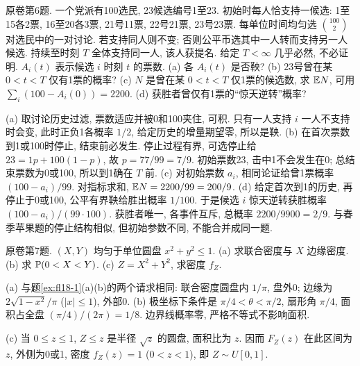 \begin{exercise}\label{ex:flf19-6}
原卷第6题. 一个党派有100选民, 23候选编号1至23. 初始时每人恰支持一候选: 1至15各2票, 16至20各3票, 21号11票, 22号21票, 23号23票. 每单位时间均匀选 $\binom{100}2$ 对选民中的一对讨论. 若支持同人则不变; 否则公平币选其中一人转而支持另一人候选. 持续至时刻 $T$ 全体支持同一人, 该人获提名. 给定 $T<\infty$ 几乎必然, 不必证明. $A_i(t)$ 表示候选 $i$ 时刻 $t$ 的票数. (a) 各 $A_i(t)$ 是否鞅? (b) 23号曾在某 $0<t<T$ 仅有1票的概率? (c) $N$ 是曾在某 $0<t<T$ 仅1票的候选数, 求 $\mathbb E N$, 可用 $\sum_i(100-A_i(0))=2200$. (d) 获胜者曾仅有1票的``惊天逆转''概率?
\end{exercise}
\begin{solution}
(a)\label{sol:flf19-6-a} 取讨论历史过滤, 票数适应并被0和100夹住, 可积. 只有一人支持 $i$ 一人不支持时会变, 此时正负1各概率 $1/2$, 给定历史的增量期望零, 所以是鞅.
(b)\label{sol:flf19-6-b} 在首次票数到1或100时停止, 结束前必发生. 停止过程有界, 可选停止给 $23=1p+100(1-p)$, 故 $p=77/99=7/9$. 初始票数23, 击中1不会发生在0; 总结束票数为0或100, 所以到1确在 $T$ 前.
(c)\label{sol:flf19-6-c} 对初始票数 $a_i$, 相同论证给曾1票概率 $(100-a_i)/99$. 对指标求和, $\mathbb E N=2200/99=200/9$.
(d)\label{sol:flf19-6-d} 给定首次到1的历史, 再停止于0或100, 公平有界鞅给胜出概率 $1/100$. 于是候选 $i$ 惊天逆转获胜概率 $(100-a_i)/(99\cdot100)$. 获胜者唯一, 各事件互斥, 总概率 $2200/9900=2/9$. 与春季苹果题的停止结构相似, 但初始参数不同, 不能合并成同一题.
\end{solution}

\begin{exercise}\label{ex:flf19-7}
原卷第7题. $(X,Y)$ 均匀于单位圆盘 $x^2+y^2\leq1$. (a) 求联合密度与 $X$ 边缘密度. (b) 求 $\mathbb P(0<X<Y)$. (c) $Z=X^2+Y^2$, 求密度 $f_Z$.
\end{exercise}
\begin{solution}
(a)\label{sol:flf19-7-a} 与题\ref{ex:fl18-1}(a)(b)的两个请求相同: 联合密度圆盘内 $1/\pi$, 盘外0; 边缘为 $2\sqrt{1-x^2}/\pi$ ($|x|\leq1$), 外部0.
(b)\label{sol:flf19-7-b} 极坐标下条件是 $\pi/4<\theta<\pi/2$, 扇形角 $\pi/4$, 面积占全盘 $(\pi/4)/(2\pi)=1/8$. 边界线概率零, 严格不等式不影响面积.
\begin{center}\end{center}
(c)\label{sol:flf19-7-c} 当 $0\leq z\leq1$, $Z\leq z$ 是半径 $\sqrt z$ 的圆盘, 面积比为 $z$. 因而 $F_Z(z)$ 在此区间为 $z$, 外侧为0或1, 密度 $f_Z(z)=1$ ($0<z<1$), 即 $Z\sim U[0,1]$.
\end{solution}

